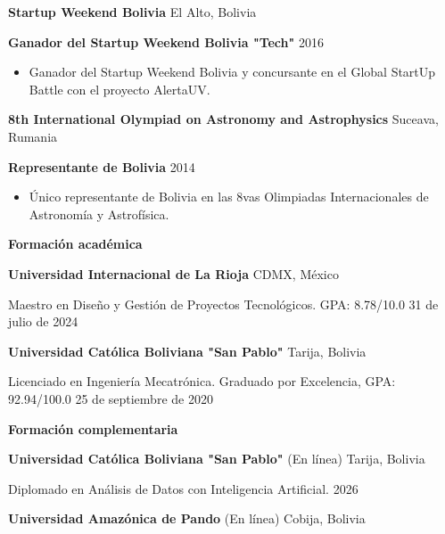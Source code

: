 \documentclass[11pt]{article}
\begin{document}
	\vspace{12pt}
	
	\textbf{Startup Weekend Bolivia}	\hfill El Alto, Bolivia
	
	\textbf{Ganador del Startup Weekend Bolivia "Tech"} \hfill 2016
	\begin{itemize}[noitemsep, topsep=0pt, partopsep=0pt, parsep=0pt]
		\item Ganador del Startup Weekend Bolivia y concursante en el Global StartUp Battle con el proyecto AlertaUV.
	\end{itemize}
	
	\vspace{12pt}
	
	\textbf{8th International Olympiad on Astronomy and Astrophysics}	\hfill Suceava, Rumania
	
	\textbf{Representante de Bolivia} \hfill 2014
	\begin{itemize}[noitemsep, topsep=0pt, partopsep=0pt, parsep=0pt]
		\item Único representante de Bolivia en las 8vas Olimpiadas Internacionales de Astronomía y Astrofísica.
	\end{itemize}
	
	\newpage
	
	
	\begin{center}
		\textbf{Formación académica}
	\end{center}
	\textbf{Universidad Internacional de La Rioja} \hfill CDMX, México
	
	Maestro en Diseño y Gestión de Proyectos Tecnológicos. GPA: 8.78/10.0 \hfill 31 de julio de 2024
	
	\vspace{12pt}
	
	\textbf{Universidad Católica Boliviana "San Pablo"} \hfill Tarija, Bolivia
	
	Licenciado en Ingeniería Mecatrónica. Graduado por Excelencia, GPA: 92.94/100.0 \hfill 25 de septiembre de 2020
	
	\begin{center}
		\textbf{Formación complementaria}
	\end{center}
	
	\textbf{Universidad Católica Boliviana "San Pablo"} \hfill (En línea) Tarija, Bolivia
	
	Diplomado en Análisis de Datos con Inteligencia Artificial. \hfill 2026
	
	\vspace{12pt}
	
	\textbf{Universidad Amazónica de Pando} \hfill (En línea) Cobija, Bolivia
	
\end{document}
